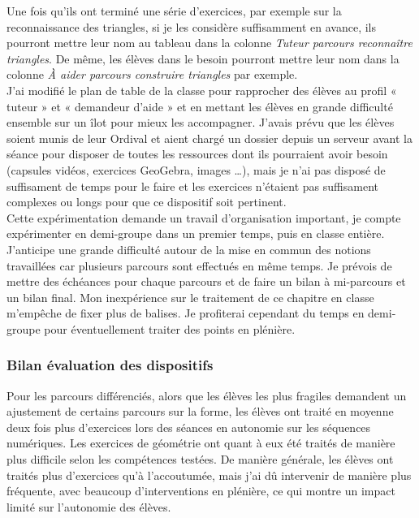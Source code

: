 Une fois qu'ils ont terminé une série d'exercices, par exemple sur la reconnaissance des triangles, si je les considère suffisamment en avance, ils pourront mettre leur nom au tableau dans la colonne \textit{Tuteur parcours reconnaître triangles}. De même, les élèves dans le besoin pourront mettre leur nom dans la colonne \textit{À aider parcours construire triangles} par exemple.\\
J'ai modifié le plan de table de la classe pour rapprocher des élèves au profil « tuteur » et « demandeur d'aide » et en mettant les élèves en grande difficulté ensemble sur un îlot pour mieux les accompagner.
J'avais prévu que les élèves soient munis de leur Ordival et aient chargé un dossier depuis un serveur avant la séance pour disposer de toutes les ressources dont ils pourraient avoir besoin (capsules vidéos, exercices GeoGebra, images \ldots), mais je n'ai pas disposé de suffisament de temps pour le faire et les exercices n'étaient pas suffisament complexes ou longs pour que ce dispositif soit pertinent.\\
Cette expérimentation demande un travail d'organisation important, je compte expérimenter en demi-groupe dans un premier temps, puis en classe entière.\\
J'anticipe une grande difficulté autour de la mise en commun des notions travaillées car plusieurs parcours sont effectués en même temps. Je prévois de mettre des échéances pour chaque parcours et de faire un bilan à mi-parcours et un bilan final. Mon inexpérience sur le traitement de ce chapitre en classe m'empêche de fixer plus de balises. Je profiterai cependant du temps en demi-groupe pour éventuellement traiter des points en plénière.

\subsubsection{Bilan évaluation des dispositifs}\label{retour_parcours}
Pour les parcours différenciés, alors que les élèves les plus fragiles demandent un ajustement de certains parcours sur la forme, les élèves ont traité en moyenne deux fois plus d'exercices lors des séances en autonomie sur les séquences numériques. Les exercices de géométrie ont quant à eux été traités de manière plus difficile selon les compétences testées. De manière générale, les élèves ont traités plus d'exercices qu'à l'accoutumée, mais j'ai dû intervenir de manière plus fréquente, avec beaucoup d'interventions en plénière, ce qui montre un impact limité sur l'autonomie des élèves.
